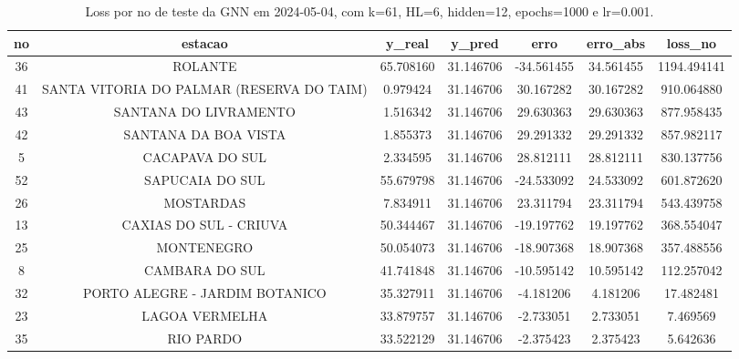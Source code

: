 \begin{table}[h]
\centering
\caption{Loss por no de teste da GNN em 2024-05-04, com k=61, HL=6, hidden=12, epochs=1000 e lr=0.001.}
\label{tab:gnn_loss_k61_hl6_h12_e1000_d20240504}
\begin{tabular}{ccccccc}
\toprule
no & estacao & y\_real & y\_pred & erro & erro\_abs & loss\_no \\
\midrule
36 & ROLANTE & 65.708160 & 31.146706 & -34.561455 & 34.561455 & 1194.494141 \\
41 & SANTA VITORIA DO PALMAR (RESERVA DO TAIM) & 0.979424 & 31.146706 & 30.167282 & 30.167282 & 910.064880 \\
43 & SANTANA DO LIVRAMENTO & 1.516342 & 31.146706 & 29.630363 & 29.630363 & 877.958435 \\
42 & SANTANA DA BOA VISTA & 1.855373 & 31.146706 & 29.291332 & 29.291332 & 857.982117 \\
5 & CACAPAVA DO SUL & 2.334595 & 31.146706 & 28.812111 & 28.812111 & 830.137756 \\
52 & SAPUCAIA DO SUL & 55.679798 & 31.146706 & -24.533092 & 24.533092 & 601.872620 \\
26 & MOSTARDAS & 7.834911 & 31.146706 & 23.311794 & 23.311794 & 543.439758 \\
13 & CAXIAS DO SUL - CRIUVA & 50.344467 & 31.146706 & -19.197762 & 19.197762 & 368.554047 \\
25 & MONTENEGRO & 50.054073 & 31.146706 & -18.907368 & 18.907368 & 357.488556 \\
8 & CAMBARA DO SUL & 41.741848 & 31.146706 & -10.595142 & 10.595142 & 112.257042 \\
32 & PORTO ALEGRE - JARDIM BOTANICO & 35.327911 & 31.146706 & -4.181206 & 4.181206 & 17.482481 \\
23 & LAGOA VERMELHA & 33.879757 & 31.146706 & -2.733051 & 2.733051 & 7.469569 \\
35 & RIO PARDO & 33.522129 & 31.146706 & -2.375423 & 2.375423 & 5.642636 \\
\bottomrule
\end{tabular}
\end{table}
